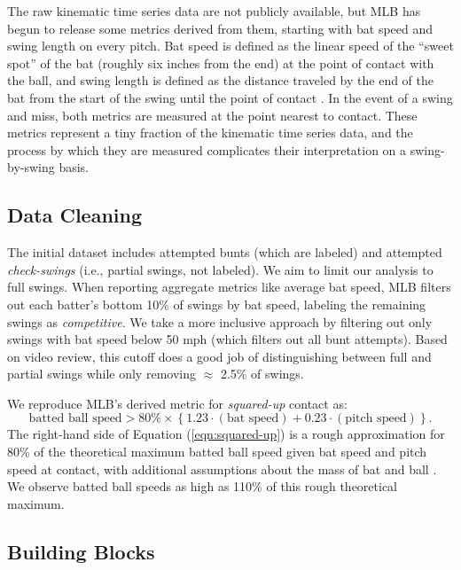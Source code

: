 \documentclass[
  12pt]{article}
\begin{document}
      The raw kinematic time series data are not publicly available, but MLB has begun to release some metrics derived from them, starting with bat speed and swing length on every pitch. Bat speed is defined as the linear speed of the ``sweet spot'' of the bat (roughly six inches from the end) at the point of contact with the ball, and swing length is defined as the distance traveled by the end of the bat from the start of the swing until the point of contact \citep{petriello_everything_2024}. In the event of a swing and miss, both metrics are measured at the point nearest to contact. These metrics represent a tiny fraction of the kinematic time series data, and the process by which they are measured complicates their interpretation on a swing-by-swing basis.

    \subsection{Data Cleaning}

    The initial dataset includes attempted bunts (which are labeled) and attempted {\it check-swings} (i.e., partial swings, not labeled). We aim to limit our analysis to full swings. When reporting aggregate metrics like average bat speed, MLB filters out each batter's bottom 10\% of swings by bat speed, labeling the remaining swings as {\it competitive}. We take a more inclusive approach by filtering out only swings with bat speed below 50 mph (which filters out all bunt attempts). Based on video review, this cutoff does a good job of distinguishing between full and partial swings while only removing $\approx$ 2.5\% of swings.

    We reproduce MLB's derived metric for {\it squared-up} contact as:
    \begin{equation}
        \label{eqn:squared-up}
    \mbox{batted ball speed} > 80\% \times \left\{1.23 \cdot (\mbox{bat speed}) + 0.23 \cdot (\mbox{pitch speed})\right\}.
    \end{equation}
    The right-hand side of Equation (\ref{eqn:squared-up}) is a rough approximation for 80\% of the theoretical maximum batted ball speed given bat speed and pitch speed at contact, with additional assumptions about the mass of bat and ball \citep{nathan_dynamics_2000}. We observe batted ball speeds as high as 110\% of this rough theoretical maximum.

    \subsection{Building Blocks}
\end{document}
